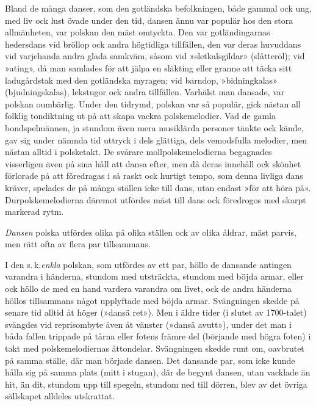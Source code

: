 \pagestyle{empty}
\fancyhfoffset[E,O]{0pt}
\addtolength{\skip\footins}{\baselineskip}
{
\setlength{\parindent}{1.5em}


{\setlength{\parindent}{0mm}
Bland de många danser, som den gotländska befolkningen,
både gammal ock ung, med liv ock lust övade under den
tid, dansen ännu var populär hos den stora allmänheten, var
polskan den mäst omtyckta. Den var gotländingarnas hedersdans vid bröllop ock andra högtidliga tillfällen, den var deras huvuddans vid varjehanda andra glada samkväm, såsom vid »sletkalsgildar» (slåtteröl); vid »ating», då man samlades för att jälpa en släkting eller granne att täcka sitt ladugårdstak med den gotländska myragen; vid barndop, »bidningkalas»
(bjudningskalas), lekstugor ock andra tillfällen. Varhälst man dansade, var polskan oumbärlig. Under den tidrymd, polskan var så populär, gick nästan all folklig tondiktning ut på att skapa vackra polskemelodier. Vad de gamla bondspelmännen, ja stundom även mera musiklärda personer tänkte ock kände, gav sig under nämnda tid uttryck i dels glättiga, dels vemodsfulla melodier, men nästan alltid i \textemdash{} polsketakt. De svårare mollpolskemelodierna begagnades visserligen även på sina håll att dansa efter, men då deras innehåll ock skönhet förlorade på att föredragas i så raskt ock hurtigt tempo, som denna livliga dans kräver, spelades de på många ställen icke till
dans, utan endast »för att höra på». Durpolskemelodierna däremot utfördes mäst till dans ock föredrogos med skarpt markerad rytm.
}

\textit{Dansen} polska utfördes olika på olika ställen ock av olika åldrar, mäst parvis, men rätt ofta av flera par tillsammans.

I den s.\,k.\@ \textit{enkla} polskan, som utfördes av ett par, höllo de dansande antingen varandra i händerna, stundom med 
utsträckta, %
stundom med böjda armar, eller ock höllo de med en hand vardera varandra om livet, ock de andra händerna höllos tillsammans något upplyftade med böjda armar. Svängningen skedde på senare tid alltid åt höger (»dansä ret»). Men i äldre tider (i slutet av 1700-talet) svängdes vid reprisombyte även åt vänster (»dansä avutt»), under det man i båda fallen trippade på tårna eller fotens främre del (börjande med högra foten) i takt med polskemelodiernas åttondelar. Svängningen skedde runt om, oavbrutet på samma ställe, där man började dansen. Det dansande par, som icke kunde hålla sig på samma plats (mitt i stugan), där de begynt dansen, utan vacklade än hit, än dit, stundom upp till spegeln, stundom ned till dörren, blev av det övriga sällskapet alldeles utskrattat.

}
